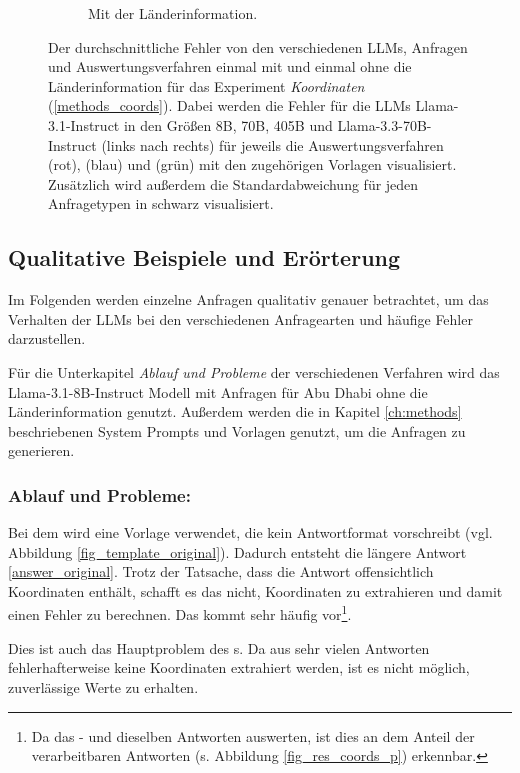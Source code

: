\begin{figure}
\begin{subfigure}{.5\textwidth}
      \caption{Mit der Länderinformation.}
      \label{fig_std_with_country}
    \end{subfigure}
    \caption{Der durchschnittliche Fehler von den verschiedenen LLMs, Anfragen und Auswertungsverfahren einmal mit und einmal ohne die Länderinformation für das Experiment \textit{Koordinaten} (\ref{methods_coords}). Dabei werden die Fehler für die LLMs Llama-3.1-Instruct in den Größen 8B, 70B, 405B und Llama-3.3-70B-Instruct (links nach rechts) für jeweils die Auswertungsverfahren \regex{} (rot), \llm{} (blau) und \json{} (grün) mit den zugehörigen Vorlagen visualisiert. Zusätzlich wird außerdem die Standardabweichung für jeden Anfragetypen in schwarz visualisiert.}
    \label{fig_std_total}
\end{figure}

\subsection{Qualitative Beispiele und Erörterung}
Im Folgenden werden einzelne Anfragen qualitativ genauer betrachtet, um das Verhalten der LLMs bei den verschiedenen Anfragearten und häufige Fehler darzustellen.

Für die Unterkapitel \textit{Ablauf und Probleme} der verschiedenen Verfahren wird das Llama-3.1-8B-Instruct Modell mit Anfragen für Abu Dhabi ohne die Länderinformation genutzt.
Außerdem werden die in Kapitel \ref{ch:methods} beschriebenen System Prompts und Vorlagen genutzt, um die Anfragen zu generieren.

\subsubsection*{Ablauf und Probleme: \regexv{}}
Bei dem \regexv{} wird eine Vorlage verwendet, die kein Antwortformat vorschreibt (vgl. Abbildung \ref{fig_template_original}).
Dadurch entsteht die längere Antwort \ref{answer_original}. Trotz der Tatsache, dass die Antwort offensichtlich Koordinaten enthält, schafft es das \regexv{} nicht, Koordinaten zu extrahieren und damit einen Fehler zu berechnen.
Das kommt sehr häufig vor\footnote{Da das \regex{}- und \llmv{} dieselben Antworten auswerten, ist dies an dem Anteil der verarbeitbaren Antworten (s. Abbildung \ref{fig_res_coords_p}) erkennbar.}.

Dies ist auch das Hauptproblem des \regexv{}s.
Da aus sehr vielen Antworten fehlerhafterweise keine Koordinaten extrahiert werden, ist es nicht möglich, zuverlässige Werte zu erhalten.

